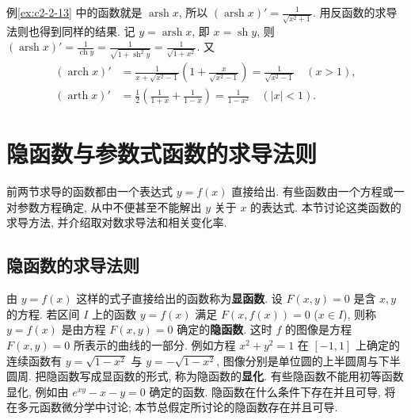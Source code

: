 \documentclass[UTF8,openany]{ctexbook}
\theoremstyle{chinesetextbook}
\begin{document}
例\ref{ex:c2-2-13} 中的函数就是 $\operatorname{arsh}x$, 所以 $\displaystyle(\operatorname{arsh}x)'=\frac1{\sqrt{x^2+1}}$. 用反函数的求导法则也得到同样的结果. 记 $y=\operatorname{arsh}x$, 即 $x=\operatorname{sh}y$, 则 $\displaystyle(\operatorname{arsh}x)'=\frac1{\operatorname{ch}y}=\frac1{\sqrt{1+\operatorname{sh}^2y}}=\frac1{\sqrt{1+x^2}}$. 又
\[
\begin{aligned}
(\operatorname{arch}x)'&=\frac1{x+\sqrt{x^2-1}}\left(1+\frac x{\sqrt{x^2-1}}\right)=\frac1{\sqrt{x^2-1}}\quad(x>1),\\
(\operatorname{arth}x)'&=\frac12\left(\frac1{1+x}+\frac1{1-x}\right)=\frac1{1-x^2}\quad(|x|<1).
\end{aligned}
\]
\section{隐函数与参数式函数的求导法则}
前两节求导的函数都由一个表达式 $y=f(x)$ 直接给出. 有些函数由一个方程或一对参数方程确定, 从中不便甚至不能解出 $y$ 关于 $x$ 的表达式. 本节讨论这类函数的求导方法, 并介绍取对数求导法和相关变化率.
\subsection{隐函数的求导法则}
由 $y=f(x)$ 这样的式子直接给出的函数称为\textbf{显函数}. 设 $F(x,y)=0$ 是含 $x,y$ 的方程. 若区间 $I$ 上的函数 $y=f(x)$ 满足 $F(x,f(x))=0$ ($x\in I$), 则称 $y=f(x)$ 是由方程 $F(x,y)=0$ 确定的\textbf{隐函数}. 这时 $f$ 的图像是方程 $F(x,y)=0$ 所表示的曲线的一部分. 例如方程 $x^2+y^2=1$ 在 $[-1,1]$ 上确定的连续函数有 $y=\sqrt{1-x^2}$ 与 $y=-\sqrt{1-x^2}$, 图像分别是单位圆的上半圆周与下半圆周. 把隐函数写成显函数的形式, 称为隐函数的\textbf{显化}. 有些隐函数不能用初等函数显化, 例如由 $e^{xy}-x-y=0$ 确定的函数. 隐函数在什么条件下存在并且可导, 将在多元函数微分学中讨论; 本节总假定所讨论的隐函数存在并且可导.
\end{document}
